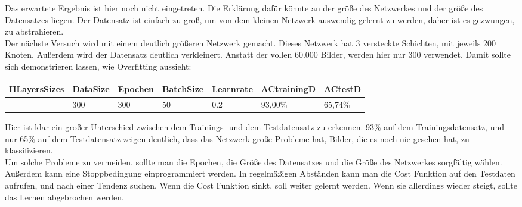 \documentclass[12pt]{article}
\begin{document}
Das erwartete Ergebnis ist hier noch nicht eingetreten. Die Erklärung dafür könnte an der größe des Netzwerkes und der größe des Datensatzes liegen. Der Datensatz ist einfach zu groß, um von dem kleinen Netzwerk auswendig gelernt zu werden, daher ist es gezwungen, zu abstrahieren.\\
Der nächste Versuch wird mit einem deutlich größeren Netzwerk gemacht. Dieses Netzwerk hat 3 versteckte Schichten, mit jeweils 200 Knoten. Außerdem wird der Datensatz deutlich verkleinert. Anstatt der vollen 60.000 Bilder, werden hier nur 300 verwendet. Damit sollte sich demonstrieren lassen, wie Overfitting aussieht:

\begin{table}[H]
    \centering
    \begin{tabular}{|p{}|l|l|l|l|l|l|}
    \hline
        HLayersSizes & DataSize & Epochen & BatchSize & Learnrate & ACtrainingD & ACtestD \\ \hline
        [784, 200, 200, 200, 10] & 300 & 300 & 50 & 0.2 & 93,00\% & 65,74\% \\ \hline
    \end{tabular}
\end{table}

Hier ist klar ein großer Unterschied zwischen dem Trainings- und dem Testdatensatz zu erkennen. 93\% auf dem Trainingsdatensatz, und nur 65\% auf dem Testdatensatz zeigen deutlich, dass das Netzwerk große Probleme hat, Bilder, die es noch nie gesehen hat, zu klassifizieren.\\
Um solche Probleme zu vermeiden, sollte man die Epochen, die Größe des Datensatzes und die Größe des Netzwerkes sorgfältig wählen. Außerdem kann eine Stoppbedingung einprogrammiert werden. In regelmäßigen Abständen kann man die Cost Funktion auf den Testdaten aufrufen, und nach einer Tendenz suchen. Wenn die Cost Funktion sinkt, soll weiter gelernt werden. Wenn sie allerdings wieder steigt, sollte das Lernen abgebrochen werden.

\cleardoublepage
\end{document}
